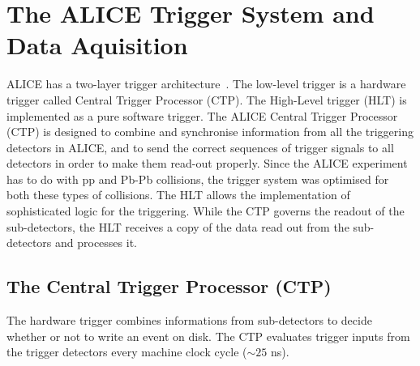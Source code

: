 \section{The ALICE Trigger System and Data Aquisition}
\label{sec:trigger}
ALICE has a two-layer trigger architecture~\cite{Fabjan:684651}. The low-level trigger is a 
hardware trigger called Central Trigger Processor (CTP). The High-Level trigger (HLT)
 is implemented as a pure software trigger. 
The ALICE Central Trigger Processor (CTP) is designed to combine and synchronise 
information from all the triggering detectors in ALICE, and to send the correct sequences
 of trigger signals to all detectors in order to make them read-out properly. Since the ALICE 
 experiment has to do with pp and Pb-Pb collisions, the trigger system was optimised 
 for both these types of collisions. The HLT allows the implementation of sophisticated 
 logic for the triggering. While the CTP governs the readout of the sub-detectors, the 
 HLT receives a copy of the data read out from the sub-detectors and processes it.

\subsection{The Central Trigger Processor (CTP)}
\label{sec:CTP}
The hardware trigger combines informations from sub-detectors to decide whether or 
not to write an event on disk. The CTP evaluates trigger inputs from the trigger detectors every machine clock cycle ($\sim25$ ns). 

